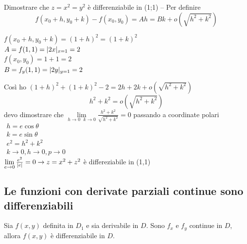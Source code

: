 \begin{esercizio}
  Dimostrare che $z=x^2=y^2$ è differenziabile in (1;1) -- Per definire
  \begin{equation*}
    f(x_0+h,y_0+k)-f(x_0,y_0)=Ah=Bk+o(\sqrt{h^2+k^2})
  \end{equation*}
  \begin{multicols}{2}
    $f(x_0+h,y_0+k)=(1+h)^2=(1+k)^2$\\
    $A=f(1,1)=\lvert2x\rvert_{x=1}=2$\\
    $f(x_0,y_0)=1+1=2$\\
    $B=f_y(1,1)=\lvert2y\rvert_{y=1}=2$
  \end{multicols}
  Così ho $(1+h)^2+(1+k)^2-2=2h+2k+o(\sqrt{h^2+k^2})$
  \begin{equation*}
    h^2+k^2=o(\sqrt{h^2+k^2})
  \end{equation*}
  devo dimostrare che $\lim\limits_{h\to 0\text{ } k\to0}\frac{h^2+k^2}{\sqrt{h^2+k^2}}=0$ passando
  a coordinate polari $\begin{matrix} h=e\cos \theta\\ k=e\sin \theta\\ e^2=h^2+k^2\\ k\to 0,h\to 0,
                         p\to 0\end{matrix}$\\ 
                       $\lim\limits_{e\to 0}\frac{e^2}{\lvert e\rvert}=0 \to z=x^2+z^2$ è differeziabile in (1,1)
\end{esercizio}
\subsection{Le funzioni con derivate parziali continue sono differenziabili}
\begin{defi}
  Sia $f(x,y)$ definita in $D_1$ e sia derivabile in $D$. Sono $f_x$ e $f_y$ continue in $D$, allora
  $f(x,y)$ è differenziabile in $D$.
\end{defi}
